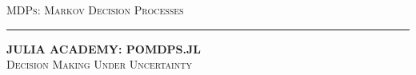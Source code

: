 
\begin{frame}[plain,c]{}

\begin{center}
\LARGE \textsc{MDPs: Markov Decision Processes}
\textcolor[RGB]{100,100,100}{\rule{\linewidth}{0.2pt}}

{\color{cardinal}\textbf{\Large{J}\normalsize{ULIA} \Large{A}\normalsize{CADEMY}: \Large{POMDP}\normalsize{S.JL}}}\\
{\normalsize\textsc{Decision Making Under Uncertainty}}

\end{center}

\end{frame}


